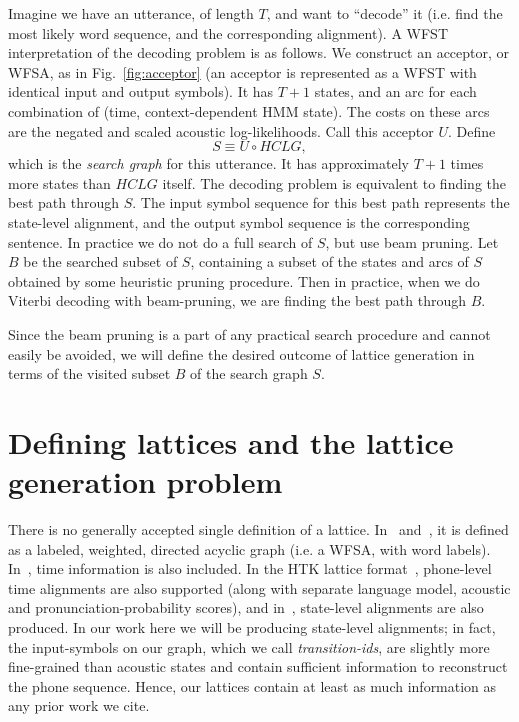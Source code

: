 \documentclass{article}
\def\HCLG{{\mathit{HCLG}}}
\begin{document}
Imagine we have an utterance, of length $T$, and want to ``decode'' it (i.e. find
the most likely word sequence, and the corresponding alignment).  A WFST
interpretation of the decoding problem is as follows.  We construct an
acceptor, or WFSA, as in Fig.~\ref{fig:acceptor} (an acceptor is represented as a
WFST with identical input and output symbols).  It has $T{+}1$ states,
and an arc for each combination of (time, context-dependent HMM state).  The
costs on these arcs are the negated and scaled acoustic log-likelihoods.
Call this acceptor $U$.  Define
\begin{equation}
   S \equiv U \circ \HCLG,
\end{equation}
which is the {\em search graph} for this utterance.  It has approximately $T+1$ times
more states than $\HCLG$ itself.  The decoding problem is equivalent to finding
the best path through $S$.  The input symbol sequence for this best path represents
the state-level alignment, and the output symbol sequence is the corresponding
sentence.  In practice we do not do a full search of $S$, but use beam pruning.
Let $B$ be the searched subset of $S$, containing a subset of the states and arcs
of $S$ obtained by some heuristic pruning procedure.  Then in practice, 
when we do Viterbi decoding with beam-pruning, we are finding the best path through $B$. 

Since the beam pruning is a part of any practical search procedure and cannot
easily be avoided, we will define the desired outcome of lattice generation in terms
of the visited subset $B$ of the search graph $S$.

\section{Defining lattices and the lattice generation problem}

There is no generally accepted single definition of a lattice.  In~\cite{efficient_general}
and~\cite{sak2010fly}, it is defined as a labeled, weighted, directed acyclic graph
(i.e. a WFSA, with word labels).  In~\cite{ney_word_graph}, time information
is also included.  In the HTK lattice format~\cite{htkbook}, phone-level time alignments 
are also supported (along with separate language model, acoustic and pronunciation-probability 
scores), and in~\cite{saon2005anatomy}, state-level alignments are also produced.
In our work here we will be producing state-level alignments; in fact, the input-symbols
on our graph, which we call {\em transition-ids}, are slightly more fine-grained
than acoustic states and contain sufficient information to reconstruct the phone
sequence.  Hence, our lattices contain at least as much information as any prior work
we cite.
\end{document}
